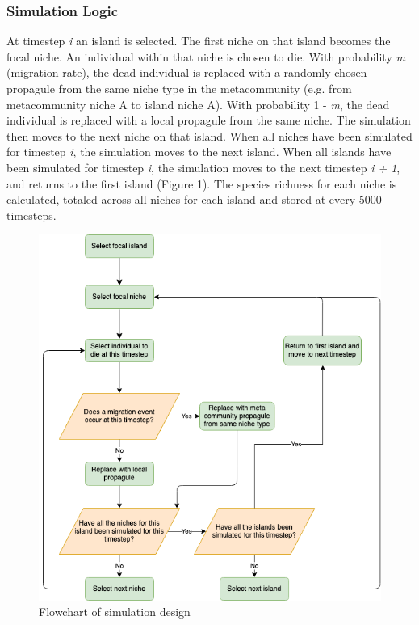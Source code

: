 \documentclass{article}
\begin{document}
\subsubsection{Simulation Logic}
At timestep \textit{i} an island is selected. The first niche on that island becomes the focal niche. An individual within that niche is chosen to die. With probability \textit{m} (migration rate), the dead individual is replaced with a randomly chosen propagule from the same niche type in the metacommunity (e.g. from metacommunity niche A to island niche A). With probability 1 - \textit{m}, the dead individual is replaced with a local propagule from the same niche. The simulation then moves to the next niche on that island. When all niches have been simulated for timestep \textit{i}, the simulation moves to the next island. When all islands have been simulated for timestep \textit{i}, the simulation moves to the next timestep \textit{i + 1}, and returns to the first island (Figure 1). The species richness for each niche is calculated, totaled across all niches for each island and stored at every 5000 timesteps.

\bigskip
 
 \begin{figure}[h!]
\centering
  \includegraphics[scale=0.4]{../../../Other/neutral_flowchart2.png}
  \caption{Flowchart of simulation design}
  \label{fig:Flowchart}
\end{figure}
\end{document}
